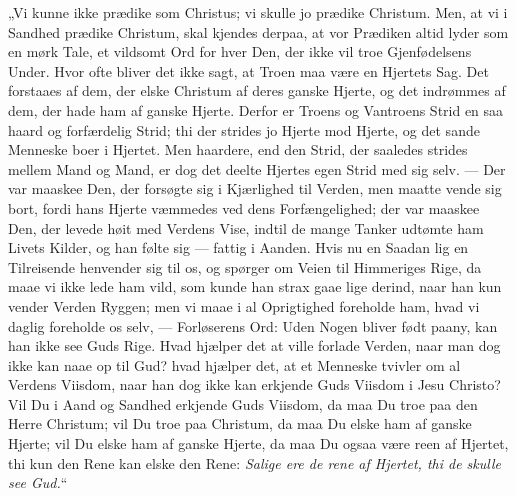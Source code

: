 \documentclass[12pt,a4paper]{book}
\begin{document}
„Vi kunne ikke prædike som Christus; vi skulle jo prædike Christum. Men, at vi i Sandhed
prædike Christum, skal kjendes derpaa, at vor Prædiken altid lyder som en mørk Tale, et
vildsomt Ord for hver Den, der ikke vil troe Gjenfødelsens Under. Hvor ofte bliver det ikke
sagt, at Troen maa være en Hjertets Sag. Det forstaaes af dem, der elske Christum af deres
ganske Hjerte, og det indrømmes af dem, der hade ham af ganske Hjerte. Derfor er Troens og
Vantroens Strid en saa haard og forfærdelig Strid; thi der strides jo Hjerte mod Hjerte, og
det sande Menneske boer i Hjertet. Men haardere, end den Strid, der saaledes strides mellem
Mand og Mand, er dog det deelte Hjertes egen Strid med sig selv. --- Der var maaskee Den,
der forsøgte sig i Kjærlighed til Verden, men maatte vende sig bort, fordi hans Hjerte
væmmedes ved dens Forfængelighed; der var maaskee Den, der levede høit med Verdens Vise,
indtil de mange Tanker udtømte ham Livets Kilder, og han følte sig --- fattig i Aanden.
Hvis nu en Saadan lig en Tilreisende henvender sig til os, og spørger om Veien til
Himmeriges Rige, da maae vi ikke lede ham vild, som kunde han strax gaae lige derind, naar
han kun vender Verden Ryggen; men vi maae i al Oprigtighed foreholde ham, hvad vi daglig
foreholde os selv, --- Forløserens Ord: {\large Uden Nogen bliver født paany, kan han ikke
see Guds Rige.} Hvad hjælper det at ville forlade Verden, naar man dog ikke kan naae op til
Gud? hvad hjælper det, at et Menneske tvivler om al Verdens Viisdom, naar han dog ikke kan
erkjende Guds Viisdom i Jesu Christo? Vil Du i Aand og Sandhed erkjende Guds Viisdom, da
maa Du troe paa den Herre Christum; vil Du troe paa Christum, da maa Du elske ham af ganske
Hjerte; vil Du elske ham af ganske Hjerte, da maa Du ogsaa være reen af Hjertet, thi
kun den Rene kan elske den Rene: \emph{Salige ere de rene af Hjertet, thi de skulle see
Gud.}“
\end{document}
